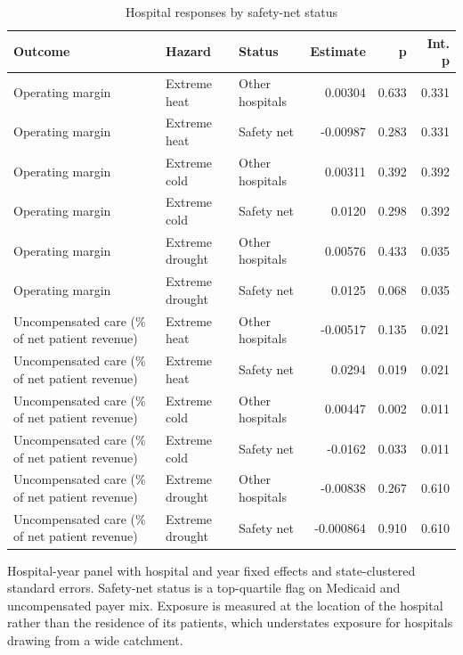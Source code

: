 \begin{table}[htbp]
\centering
\scriptsize
\setlength{\tabcolsep}{4pt}
\sloppy
\caption{Hospital responses by safety-net status}
\label{tab:e3t4}
\begin{tabularx}{\textwidth}{>{\raggedright\arraybackslash}X >{\raggedright\arraybackslash}p{2.4cm} >{\raggedright\arraybackslash}p{2.5cm} r r r}
\toprule
Outcome & Hazard & Status & Estimate & p & Int. p \\
\midrule
Operating margin & Extreme heat & Other hospitals & 0.00304 & 0.633 & 0.331 \\
Operating margin & Extreme heat & Safety net & -0.00987 & 0.283 & 0.331 \\
Operating margin & Extreme cold & Other hospitals & 0.00311 & 0.392 & 0.392 \\
Operating margin & Extreme cold & Safety net & 0.0120 & 0.298 & 0.392 \\
Operating margin & Extreme drought & Other hospitals & 0.00576 & 0.433 & 0.035 \\
Operating margin & Extreme drought & Safety net & 0.0125 & 0.068 & 0.035 \\
Uncompensated care (\% of net patient revenue) & Extreme heat & Other hospitals & -0.00517 & 0.135 & 0.021 \\
Uncompensated care (\% of net patient revenue) & Extreme heat & Safety net & 0.0294 & 0.019 & 0.021 \\
Uncompensated care (\% of net patient revenue) & Extreme cold & Other hospitals & 0.00447 & 0.002 & 0.011 \\
Uncompensated care (\% of net patient revenue) & Extreme cold & Safety net & -0.0162 & 0.033 & 0.011 \\
Uncompensated care (\% of net patient revenue) & Extreme drought & Other hospitals & -0.00838 & 0.267 & 0.610 \\
Uncompensated care (\% of net patient revenue) & Extreme drought & Safety net & -0.000864 & 0.910 & 0.610 \\
\bottomrule
\end{tabularx}
\begin{minipage}{\textwidth}\vspace{0.5em}\footnotesize
Hospital-year panel with hospital and year fixed effects and state-clustered standard errors. Safety-net status is a top-quartile flag on Medicaid and uncompensated payer mix. Exposure is measured at the location of the hospital rather than the residence of its patients, which understates exposure for hospitals drawing from a wide catchment.
\end{minipage}
\end{table}
